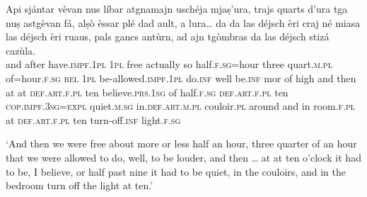 \begin{linenumbers}
\gll    Api sjántar vèvan nus líbar atgnamajn uschéja mjaṣ’ura, trajs quarts d’ura tga nuṣ astgèvan fá, alṣò èssar plé dad ault, a lura… da da las déjsch èri craj né miasa las déjsch èri ruaus, pals gancs antùrn, ad ajn tgòmbras da las déjsch stizá cazùla.\\
and after have.\textsc{impf.1pl} \textsc{1pl} free actually so half.\textsc{f.sg=}hour three quart.\textsc{m.pl}  of=hour.\textsc{f.sg} \textsc{rel} \textsc{1pl} be-allowed.\textsc{impf.1pl}  do.\textsc{inf} well be.\textsc{inf} mor of high and then at at \textsc{def.art.f.pl} ten believe.\textsc{prs.1sg} of  half.\textsc{f.sg} \textsc{def.art.f.pl} ten \textsc{cop.impf.3sg=expl} quiet.\textsc{m.sg} in.\textsc{def.art.m.pl} couloir.\textsc{pl} around and in room.\textsc{f.pl} at \textsc{def.art.f.pl} ten turn-off.\textsc{inf} light.\textsc{f.sg}\\
\end{linenumbers}
\medskip
\glt `And then we were free about more or less half an hour, three quarter of an hour that we were allowed to do, well, to be louder, and then … at at ten o’clock it had to be, I believe, or half past nine it had to be quiet, in the couloirs, and in the bedroom turn off the light at ten.'
\medskip







